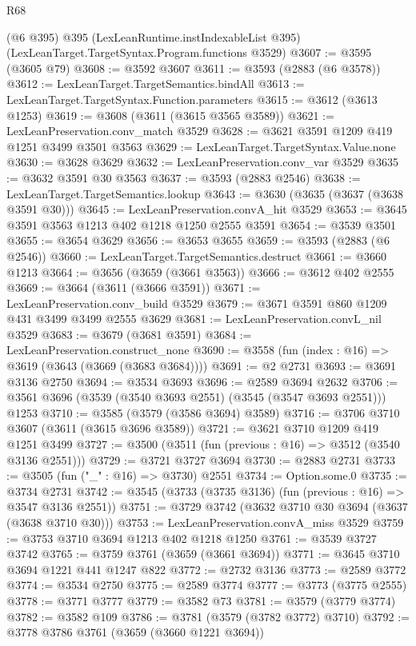 \begin{lexlean}{R68}
\begin{coremodule}
    (@6 @395)
    @395
    (LexLeanRuntime.instIndexableList @395)
    (LexLeanTarget.TargetSyntax.Program.functions @3529)
@3607 := @3595 (@3605 @79)
@3608 := @3592 @3607
@3611 := @3593 (@2883 (@6 @3578))
@3612 := LexLeanTarget.TargetSemantics.bindAll
@3613 := LexLeanTarget.TargetSyntax.Function.parameters
@3615 := @3612 (@3613 @1253)
@3619 := @3608 (@3611 (@3615 @3565 @3589))
@3621 := LexLeanPreservation.conv_match @3529
@3628 := @3621 @3591 @1209 @419 @1251 @3499 @3501 @3563
@3629 := LexLeanTarget.TargetSyntax.Value.none
@3630 := @3628 @3629
@3632 := LexLeanPreservation.conv_var @3529
@3635 := @3632 @3591 @30 @3563
@3637 := @3593 (@2883 @2546)
@3638 := LexLeanTarget.TargetSemantics.lookup
@3643 := @3630 (@3635 (@3637 (@3638 @3591 @30)))
@3645 := LexLeanPreservation.convA_hit @3529
@3653 := @3645 @3591 @3563 @1213 @402 @1218 @1250 @2555 @3591
@3654 := @3539 @3501
@3655 := @3654 @3629
@3656 := @3653 @3655
@3659 := @3593 (@2883 (@6 @2546))
@3660 := LexLeanTarget.TargetSemantics.destruct
@3661 := @3660 @1213
@3664 := @3656 (@3659 (@3661 @3563))
@3666 := @3612 @402 @2555
@3669 := @3664 (@3611 (@3666 @3591))
@3671 := LexLeanPreservation.conv_build @3529
@3679 := @3671 @3591 @860 @1209 @431 @3499 @3499 @2555 @3629
@3681 := LexLeanPreservation.convL_nil @3529
@3683 := @3679 (@3681 @3591)
@3684 := LexLeanPreservation.construct_none
@3690 := @3558 (fun (index : @16) => @3619 (@3643 (@3669 (@3683 @3684))))
@3691 := @2 @2731
@3693 := @3691 @3136 @2750
@3694 := @3534 @3693
@3696 := @2589 @3694 @2632
@3706 := @3561 @3696 (@3539 (@3540 @3693 @2551) (@3545 (@3547 @3693 @2551))) @1253
@3710 := @3585 (@3579 (@3586 @3694) @3589)
@3716 := @3706 @3710 @3607 (@3611 (@3615 @3696 @3589))
@3721 := @3621 @3710 @1209 @419 @1251 @3499
@3727 := @3500 (@3511 (fun (previous : @16) => @3512 (@3540 @3136 @2551)))
@3729 := @3721 @3727 @3694
@3730 := @2883 @2731
@3733 := @3505 (fun ("_" : @16) => @3730) @2551
@3734 := Option.some.{0}
@3735 := @3734 @2731
@3742 := @3545 (@3733 (@3735 @3136) (fun (previous : @16) => @3547 @3136 @2551))
@3751 := @3729 @3742 (@3632 @3710 @30 @3694 (@3637 (@3638 @3710 @30)))
@3753 := LexLeanPreservation.convA_miss @3529
@3759 := @3753 @3710 @3694 @1213 @402 @1218 @1250
@3761 := @3539 @3727 @3742
@3765 := @3759 @3761 (@3659 (@3661 @3694))
@3771 := @3645 @3710 @3694 @1221 @441 @1247 @822
@3772 := @2732 @3136
@3773 := @2589 @3772
@3774 := @3534 @2750
@3775 := @2589 @3774
@3777 := @3773 (@3775 @2555)
@3778 := @3771 @3777
@3779 := @3582 @73
@3781 := @3579 (@3779 @3774)
@3782 := @3582 @109
@3786 := @3781 (@3579 (@3782 @3772) @3710)
@3792 := @3778 @3786 @3761 (@3659 (@3660 @1221 @3694))

\end{coremodule}
\end{lexlean}
